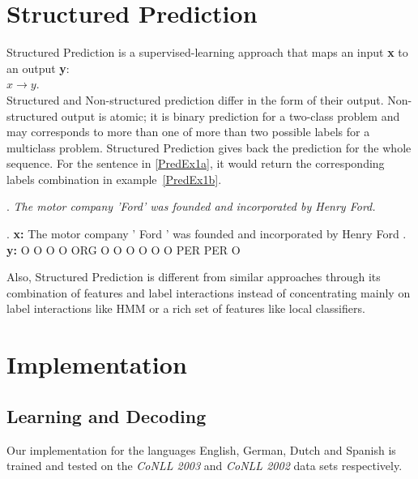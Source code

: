 \documentclass[11pt]{article}
\begin{document}
\section{Structured Prediction}
Structured Prediction \cite{strlearn} is a supervised-learning approach that maps an input \textbf{x} to an output \textbf{y}: \\

$ x \rightarrow y $. \\

Structured and  Non-structured prediction differ in the form of their output. 
Non-structured output is atomic; it is binary prediction for a two-class problem and may corresponds to more than one of more than two possible labels for a 
multiclass problem. 
Structured Prediction gives back the prediction for the whole sequence. 
For the sentence in \ref{PredEx1a}, it would return the corresponding labels combination in example~\ref{PredEx1b}. 

\begin{figure*}[ht]

\ex. \emph{The motor company 'Ford' was founded and incorporated  by Henry Ford.} \label{PredEx1a}
 
\exg. \textbf{x:} The motor company ' Ford ' was founded and incorporated by Henry Ford .\\
      \textbf{y:} O O O O ORG  O  O O O O O PER PER O  \label{PredEx1b} \\
\caption{Input and predicted structure for the Named Entity task.}

\end{figure*}

Also, Structured Prediction is different from similar approaches through its combination of features and label interactions instead
of concentrating mainly on label interactions like HMM or a rich set of features like local classifiers. 

\section{Implementation}

\subsection{Learning and Decoding}

Our implementation for the languages English, German, Dutch and Spanish is trained and tested on the \emph{CoNLL 2003} and \emph{CoNLL 2002} data sets respectively. 
\end{document}
